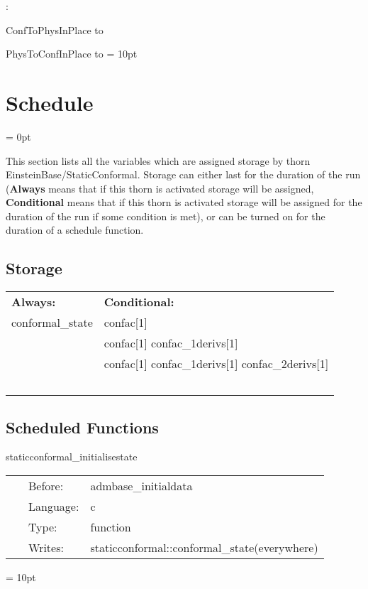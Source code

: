 \documentclass{article}
\begin{document}
\vspace{5mm}

: 



ConfToPhysInPlace to 

PhysToConfInPlace to 
\vspace{2mm}\parskip = 10pt 

\section{Schedule} 


\parskip = 0pt


\noindent This section lists all the variables which are assigned storage by thorn EinsteinBase/StaticConformal.  Storage can either last for the duration of the run ({\bf Always} means that if this thorn is activated storage will be assigned, {\bf Conditional} means that if this thorn is activated storage will be assigned for the duration of the run if some condition is met), or can be turned on for the duration of a schedule function.


\subsection*{Storage}

\hspace{5mm}

 \begin{tabular*}{160mm}{ll} 

{\bf Always:}& {\bf Conditional:} \\ 
 conformal\_state &  confac[1]\\ 
~ &  confac[1] confac\_1derivs[1]\\ 
~ &  confac[1] confac\_1derivs[1] confac\_2derivs[1]\\ 
~ & ~\\ 
\end{tabular*} 


\subsection*{Scheduled Functions}
\vspace{5mm}


\hspace{5mm} staticconformal\_initialisestate 

\hspace{5mm}{\it set the conformal\_state variable to 0 } 


\hspace{5mm}

 \begin{tabular*}{160mm}{cll} 
~ & Before:  & admbase\_initialdata \\ 
~ & Language:  & c \\ 
~ & Type:  & function \\ 
~ & Writes:  & staticconformal::conformal\_state(everywhere) \\ 
\end{tabular*} 



\vspace{5mm}\parskip = 10pt 
\end{document}
